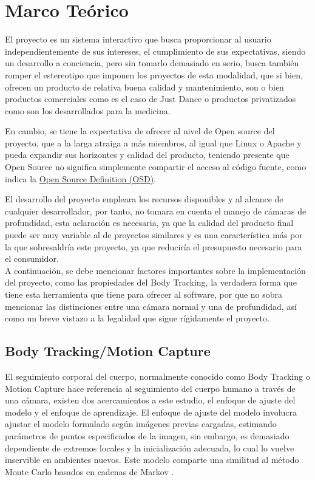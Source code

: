 \chapter{Marco Teórico}

El proyecto es un sistema interactivo que busca proporcionar al usuario independientemente de sus intereses, el cumplimiento de sus expectativas, siendo un desarrollo a conciencia, pero sin tomarlo demasiado en serio, busca también romper el estereotipo que imponen los proyectos de esta modalidad, que si bien, ofrecen un producto de relativa buena calidad y mantenimiento, son o bien productos comerciales como es el caso de Just Dance o productos privatizados como son los desarrollados para la medicina. 

En cambio, se tiene la expectativa de ofrecer al nivel de Open source del proyecto, que a la larga atraiga a más miembros, al igual que Linux o Apache y pueda expandir sus horizontes y calidad del producto, teniendo presente que Open Source no significa simplemente compartir el acceso al código fuente, como indica la \href{https://opensource.org/docs/definition.html}{Open Source Definition (OSD)}. 

El desarrollo del proyecto empleara los recursos disponibles y al alcance de cualquier desarrollador, por tanto, no tomara en cuenta el manejo de cámaras de profundidad, esta aclaración es necesaria, ya que la calidad del producto final puede ser muy variable al de proyectos similares y es una característica más por la que sobresaldría este proyecto, ya que reduciría el presupuesto necesario para el consumidor.\\

A continuación, se debe mencionar factores importantes sobre la implementación del proyecto, como las propiedades del Body Tracking, la verdadera forma que tiene esta herramienta que tiene para ofrecer al software, por que no sobra mencionar las distinciones entre una cámara normal y una de profundidad, así como un breve vistazo a la legalidad que sigue rígidamente el proyecto.

\section{Body Tracking/Motion Capture}

El seguimiento corporal del cuerpo, normalmente conocido como Body Tracking o Motion Capture hace referencia al seguimiento del cuerpo humano a través de una cámara, existen dos acercamientos a este estudio, el enfoque de ajuste del modelo y el enfoque de aprendizaje. El enfoque de ajuste del modelo involucra ajustar el modelo formulado según imágenes previas cargadas, estimando parámetros de puntos especificados de la imagen, sin embargo, es demasiado dependiente de extremos locales y la inicialización adecuada, lo cual lo vuelve inservible en ambientes nuevos. Este modelo comparte una similitud al método Monte Carlo basados en cadenas de Markov \cite{siddiqui2010human}.

